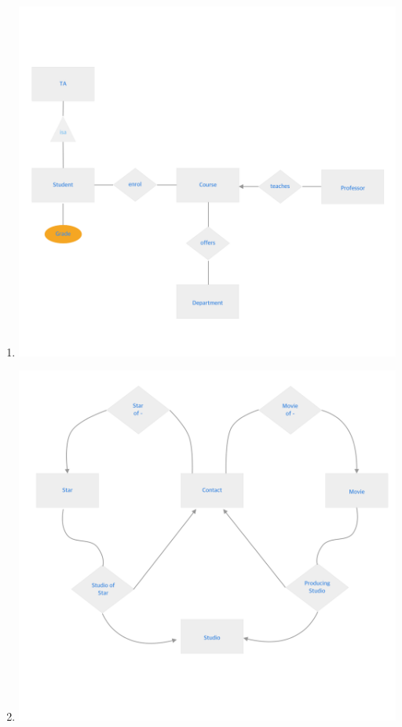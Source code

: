 \documentclass[12pt]{article}
\begin{document}
\begin{enumerate}[1.]
\begin{enumerate}[a)]
    \end{enumerate}

    \item

    \begin{center}
    \includegraphics[width=\linewidth]{images/worksheet_14_solution_33.png}
    \end{center}

    \item

    \begin{center}
    \includegraphics[width=\linewidth]{images/worksheet_14_solution_34.png}
    \end{center}


\end{enumerate}
\end{document}
